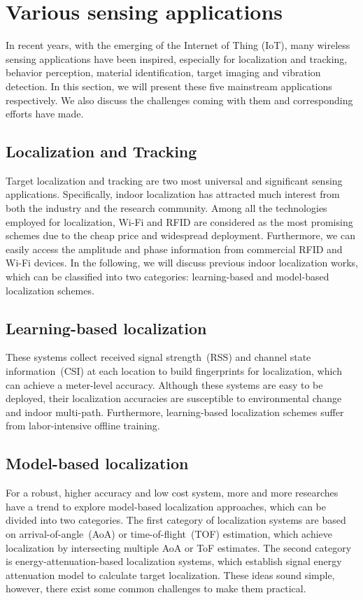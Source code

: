 \section {Various sensing applications}

In recent years, with the emerging of the Internet of Thing (IoT), many wireless sensing applications have been inspired, especially for
localization and tracking, behavior perception, material identification, target imaging and vibration detection. In this section, we will
present these five mainstream applications respectively. We also discuss the challenges coming with them and corresponding efforts have
made.

\subsection{Localization and Tracking} Target localization and tracking are two most universal and significant sensing applications.
Specifically, indoor localization has attracted much interest from both the industry and the research community. Among all the technologies
employed for localization, Wi-Fi and RFID are considered as the most promising schemes due to the cheap price and widespread deployment.
Furthermore, we can easily access the amplitude and phase information from commercial RFID and Wi-Fi devices. In the following, we will
discuss previous indoor localization works, which can be classified into two categories: learning-based and model-based localization
schemes.

\subsection{Learning-based localization} These systems collect received signal strength~(RSS) and channel state information~(CSI) at each
location to build fingerprints for localization, which can achieve a meter-level accuracy. Although these systems are easy to be deployed,
their localization accuracies are susceptible to environmental change and indoor multi-path. Furthermore, learning-based localization
schemes suffer from labor-intensive offline training.

\subsection{Model-based localization} For a robust, higher accuracy and low cost system, more and more researches have a trend to explore
model-based localization approaches, which can be divided into two categories. The first category of localization systems are based on
arrival-of-angle~(AoA) or time-of-flight~(TOF) estimation, which achieve localization by intersecting multiple AoA or ToF estimates. The
second category is energy-attenuation-based localization systems, which establish signal energy attenuation model to calculate target
localization. These ideas sound simple, however, there exist some common challenges to make them practical.

